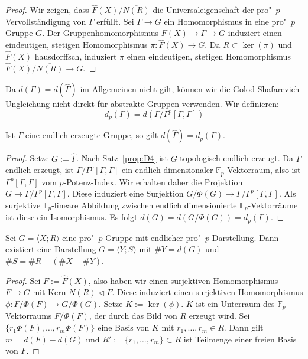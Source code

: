\documentclass[11pt,a4paper,openany]{memoir}
\begin{document}
\begin{proof}
Wir zeigen, dass $\widehat{F}(X)/\overline{N(R)}$ die Universaleigenschaft der pro"~$p$ Vervollständigung von $\Gamma$ erfüllt. Sei $\Gamma \to G$ ein Homomorphismus in eine pro"~$p$ Gruppe $G$. Der Gruppenho\-mo\-mor\-phis\-mus $F(X)\to \Gamma\to G$ induziert einen eindeutigen, stetigen Homomorphismus $\pi:\widehat{F}(X)\to G$. Da $R\subset\ker(\pi)$ und $\widehat{F}(X)$ hausdorffsch, induziert $\pi$ einen eindeutigen, stetigen Homomorphismus $\widehat{F}(X)/\overline{N(R)}\to G$.
\end{proof}

\begin{definition}
Da $d(\Gamma)=d(\widehat{\Gamma})$ im Allgemeinen nicht gilt, können wir die Golod-Shafarevich Ungleichung nicht direkt für abstrakte Gruppen verwenden. Wir definieren:
\[d_p(\Gamma)=d(\Gamma/\Gamma^p[\Gamma,\Gamma]) \]
\end{definition}

\begin{proposition}\label{prop:D5}
Ist $\Gamma$ eine endlich erzeugte Gruppe, so gilt $d(\widehat{\Gamma})=d_p(\Gamma)$.
\end{proposition}

\begin{proof}
Setze $G:=\widehat{\Gamma}$. Nach Satz~\ref{prop:D4} ist $G$ topologisch endlich erzeugt. Da $\Gamma$ endlich erzeugt, ist $\Gamma/\Gamma^p[\Gamma,\Gamma]$ ein endlich dimensionaler $\mathbb{F}_p$-Vektorraum, also ist $\Gamma^p[\Gamma,\Gamma]$ vom $p$-Potenz-Index. Wir erhalten daher die Projektion $G\to\Gamma/\Gamma^p[\Gamma,\Gamma]$. Diese induziert eine Surjektion $G/\Phi(G)\to\Gamma/\Gamma^p[\Gamma,\Gamma]$. Als surjektive $\mathbb{F}_p$-lineare Abbildung zwischen endlich dimensionierte $\mathbb{F}_p$-Vektorräume ist diese ein Isomorphismus. Es folgt $d(G)=d(G/\Phi(G))=d_p(\Gamma)$.
\end{proof}

\begin{proposition}\label{prop:D6}
Sei $G=\langle X;R\rangle$ eine pro"~$p$ Gruppe mit endlicher pro"~$p$ Darstellung. Dann existiert eine Darstellung $G=\langle Y;S\rangle$ mit $\#Y=d(G)$ und $\#S=\#R-(\#X-\#Y)$.
\end{proposition}

\begin{proof}
Sei $F:=\widehat{F}(X)$, also haben wir einen surjektiven Homomorphismus $F\to G$ mit Kern $\overline{N(R)}\lhd F$. Diese induziert einen surjektiven Homomorphismus $\phi:F/\Phi(F)\to G/\Phi(G)$. Setze $K:=\ker(\phi)$. $K$ ist ein Unterraum des $\mathbb{F}_p$-Vektorraums $F/\Phi(F)$, der durch das Bild von $R$ erzeugt wird. Sei $\{r_1\Phi(F),\ldots,r_m\Phi(F)\}$ eine Basis von $K$ mit $r_1,\ldots,r_m\in R$. Dann gilt $m=d(F)-d(G)$ und $R':=\{r_1,\ldots,r_m\}\subset R$ ist Teilmenge einer freien Basis von $F$.
\end{proof}
\end{document}
